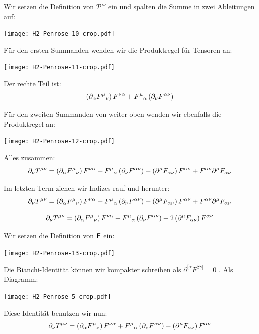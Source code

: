 Wir setzen die Definition von $T^{\mu\nu}$ ein und spalten die Summe in zwei
Ableitungen auf:
\begin{center}
	\texttt{[image: H2-Penrose-10-crop.pdf]}
\end{center}

Für den ersten Summanden wenden wir die Produktregel für Tensoren an:
\begin{center}
	\texttt{[image: H2-Penrose-11-crop.pdf]}
\end{center}

Der rechte Teil ist:
\[
	\del{\partial_\alpha F^{\mu}{}_\nu} F^{\nu\alpha}
	+ F^\mu{}_\alpha \del{\partial_\nu F^{\alpha\nu}}
\]

Für den zweiten Summanden von weiter oben wenden wir ebenfalls die Produktregel
an:
\begin{center}
	\texttt{[image: H2-Penrose-12-crop.pdf]}
\end{center}

Alles zusammen:
\[
	\partial_\nu T^{\mu\nu}
	=
	\del{\partial_\alpha F^{\mu}{}_\nu} F^{\nu\alpha}
	+ F^\mu{}_\alpha \del{\partial_\nu F^{\alpha\nu}}
	+ \del{\partial^\mu F_{\alpha\nu}} F^{\alpha\nu}
	+ F^{\alpha\nu} \partial^\mu F_{\alpha\nu}
\]

Im letzten Term ziehen wir Indizes rauf und herunter:
\[
	\partial_\nu T^{\mu\nu}
	=
	\del{\partial_\alpha F^{\mu}{}_\nu} F^{\nu\alpha}
	+ F^\mu{}_\alpha \del{\partial_\nu F^{\alpha\nu}}
	+ \del{\partial^\mu F_{\alpha\nu}} F^{\alpha\nu}
	+ F^{\alpha\nu} \partial^\mu F_{\alpha\nu}
\]

\[
	\partial_\nu T^{\mu\nu}
	=
	\del{\partial_\alpha F^{\mu}{}_\nu} F^{\nu\alpha}
	+ F^\mu{}_\alpha \del{\partial_\nu F^{\alpha\nu}}
	+ 2\del{\partial^\mu F_{\alpha\nu}} F^{\alpha\nu}
\]

Wir setzen die Definition von $\boldsymbol{\mathsf{F}}$ ein:
\begin{center}
	\texttt{[image: H2-Penrose-13-crop.pdf]}
\end{center}

Die Bianchi-Identität können wir kompakter schreiben als $\partial^{[\alpha}
F^{\beta\gamma]} = 0$ \cite[Seite 303]{penrose-road_to_reality}. Als Diagramm:
\begin{center}
	\texttt{[image: H2-Penrose-5-crop.pdf]}
\end{center}

Diese Identität benutzen wir nun:
\[
	\partial_\nu T^{\mu\nu}
	=
	\del{\partial_\alpha F^{\mu}{}_\nu} F^{\nu\alpha}
	+ F^\mu{}_\alpha \del{\partial_\nu F^{\alpha\nu}}
	- \del{\partial^\mu F_{\alpha\nu}} F^{\alpha\nu}
\]


